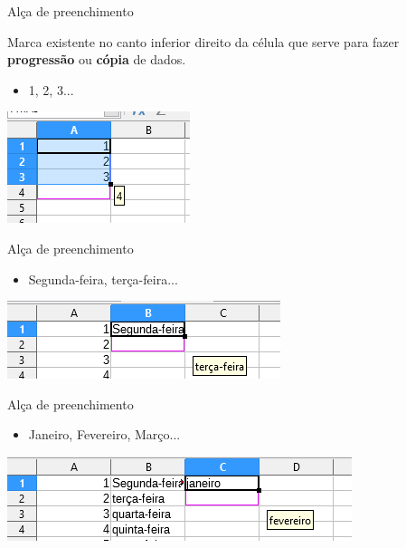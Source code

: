 \begin{frame}{Alça de preenchimento}
	\begin{block}{}
		Marca existente no canto inferior direito da célula que serve para fazer \textbf{progressão} ou \textbf{cópia} de dados.
		\begin{itemize}
			\item 1, 2, 3...
		\end{itemize}
	\end{block}
	
	\centering
	\includegraphics[width=0.7\linewidth]{Figuras/Ch06/fig5}
\end{frame}


\begin{frame}{Alça de preenchimento}
	\begin{block}{}
		\begin{itemize}
			\item Segunda-feira, terça-feira...
		\end{itemize}
	\end{block}

	\bigskip
	
	\centering
	\includegraphics[width=1\linewidth]{Figuras/Ch06/fig6}
\end{frame}


\begin{frame}{Alça de preenchimento}
	\begin{block}{}
		\begin{itemize}
			\item Janeiro, Fevereiro, Março...
		\end{itemize}
	\end{block}
	
	\bigskip
	
	\centering
	\includegraphics[width=1\linewidth]{Figuras/Ch06/fig7}
\end{frame}


